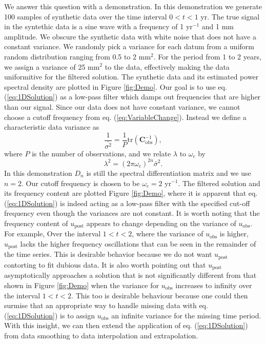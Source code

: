 \documentclass[10pt,a4paper]{article}
\begin{document}
We answer this question with a demonstration.  In this demonstration we generate 100 samples of synthetic data over the time interval $0<t<1$ yr.  The true signal in the syntethic data is a sine wave with a frequency of 1 yr$^{-1}$ and 1 mm amplitude.  We obscure the synthetic data with white noise that does not have a constant variance.  We randomly pick a variance for each datum from a uniform random distribution ranging from 0.5 to 2 mm$^2$.  For the period from 1 to 2 years, we assign a variance of 25 mm$^2$ to the data, effectively making the data uniformitive for the filtered solution.  The synthetic data and its estimated power spectral density are plotted in Figure \ref{fig:Demo}.  Our goal is to use eq. (\ref{eq:1DSolution}) as a low-pass filter which damps out frequencies that are higher than our signal.  Since our data does not have constant variance, we cannot choose a cutoff frequency from eq. (\ref{eq:VariableChange}).  Instead we define a characteristic data variance as
\begin{equation}
\frac{1}{\bar{\sigma^2}} = \frac{1}{P} \mathrm{tr}\left(\mathbf{C}_\mathrm{obs}^{-1}\right),
\end{equation}
where $P$ is the number of observations, and we relate $\lambda$ to $\omega_c$ by
\begin{equation}
\lambda^2 = (2\pi\omega_c)^{2n}\bar{\sigma}^2.  
\end{equation}
In this demonstration $D_n$ is still the spectral differentiation matrix and we use $n=2$. Our cutoff frequency is chosen to be $\omega_c=2$ yr$^{-1}$.  The filtered solution and its frequency content are plotted Figure \ref{fig:Demo}, where it is apparent that eq. (\ref{eq:1DSolution}) is indeed acting as a low-pass filter with the specified cut-off frequency even though the variances are not constant. It is worth noting that the frequency content of $u_\mathrm{post}$ appears to change depending on the variance of $u_\mathrm{obs}$. For example, Over the interval $1<t<2$, where the variance of $u_\mathrm{obs}$ is higher, $u_\mathrm{post}$ lacks the higher frequency oscillations that can be seen in the remainder of the time series. This is desirable behavior because we do not want $u_\mathrm{post}$ contorting to fit dubious data.  It is also worth pointing out that $u_\mathrm{post}$ asymptotically approaches a solution that is not significantly different from that shown in Figure \ref{fig:Demo} when the variance for $u_\mathrm{obs}$ increases to infinity over the interval $1<t<2$.  This too is desirable behaviour because one could then surmise that an appropriate way to handle missing data with eq. (\ref{eq:1DSolution}) is to assign $u_\mathrm{obs}$ an infinite variance for the missing time period.  With this insight, we can then extend the application of eq. (\ref{eq:1DSolution}) from data smoothing to data interpolation and extrapolation.   
\end{document}
